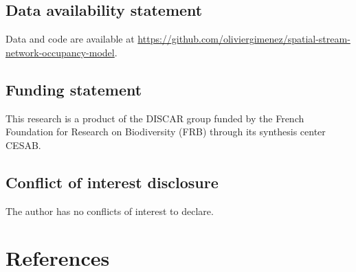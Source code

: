 \documentclass[
  11pt,
  a4paper,
]{article}
\begin{document}
\subsection{Data availability statement}\label{data-availability-statement}

Data and code are available at \href{https://github.com/oliviergimenez/spatial-stream-network-occupancy-model}{https://github.com/oliviergimenez/spatial-stream-network-occupancy-model}.

\subsection{Funding statement}\label{funding-statement}

This research is a product of the DISCAR group funded by the French Foundation for Research on Biodiversity (FRB) through its synthesis center CESAB.

\subsection{Conflict of interest disclosure}\label{conflict-of-interest-disclosure}

The author has no conflicts of interest to declare.

\section{References}\label{references}
\end{document}
